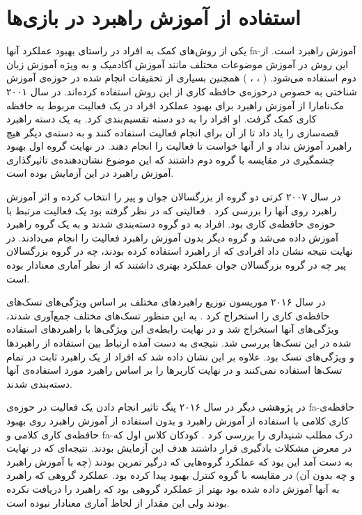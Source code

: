 \documentclass[twoside, a4paper,11pt]{book}
\numberwithin{equation}{chapter}
\numberwithin{table}{chapter}
\numberwithin{figure}{chapter}
\numberwithin{equation}{chapter}
\newcommand{\mls}[1]{\gls{fa-#1}\glsuseri{la-#1}}
\begin{document}
\section{استفاده از آموزش راهبرد در بازی‌ها}
یکی از روش‌های کمک به افراد در راستای بهبود عملکرد آنها \mls{آموزش راهبرد} است. از این روش در آموزش موضوعات مختلف مانند آموزش آکادمیک و به ویژه آموزش زبان دوم استفاده می‌شود. ( \cite{oxford1989LangStrategy}، \cite{nunan2017Lan}، \cite{donker2014Academic}) همچنین بسیاری از تحقیقات انجام شده در حوزه‌ی آموزش شناختی به خصوص درحوزه‌ی حافظه کاری از این روش استفاده کرده‌اند. در سال ۲۰۰۱ مک‌نامارا \cite{mcnamara2001MemCap} از آموزش راهبرد برای بهبود عملکرد افراد در یک فعالیت مربوط به حافظه کاری کمک گرفت. او افراد را به دو دسته تقسیم‌بندی کرد. به یک دسته راهبرد قصه‌سازی را یاد داد تا از آن برای انجام فعالیت استفاده کنند و به دسته‌ی دیگر هیچ راهبرد آموزش نداد و از آنها خواست تا فعالیت را انجام دهند. در نهایت گروه اول بهبود چشمگیری در مقایسه با گروه دوم داشتند که این موضوع نشان‌دهنده‌ی تاثیرگذاری آموزش راهبرد در این آزمایش بوده است.

در سال ۲۰۰۷ کرتی دو گروه از بزرگسالان جوان و پیر را انتخاب کرده و اثر آموزش راهبرد روی آنها را بررسی کرد \cite{carretti2007StaMem}. فعالیتی که در نظر گرفته بود یک فعالیت مرتبط با حوزه‌ی حافظه‌ی کاری بود. افراد به دو گروه دسته‌بندی شدند و به یک گروه راهبرد آموزش داده می‌شد و گروه دیگر بدون آموزش راهبرد فعالیت را انجام می‌دادند. در نهایت نتیجه نشان داد افرادی که از راهبرد استفاده کرده بودند، چه در گروه بزرگسالان پیر چه در گروه بزرگسالان جوان عملکرد بهتری داشتند که از نظر آماری معنادار بوده است.

در سال ۲۰۱۶ موریسون توزیع راهبرد‌های مختلف بر اساس ویژگی‌های تسک‌های حافظه‌ی کاری را استخراج کرد \cite{morrison2016variation}. به این منظور تسک‌های مختلف جمع‌آوری شدند، ویژگی‌های آنها استخراج شد و در نهایت رابطه‌ی این ویژگی‌ها با راهبرد‌های استفاده شده در این تسک‌ها بررسی شد. نتیجه‌ی به دست آمده ارتباط بین استفاده از راهبرد‌ها و ویژگی‌های تسک بود. علاوه بر این نشان داده شد که افراد از یک راهبرد ثابت در تمام تسک‌ها استفاده نمی‌کنند و در نهایت کاربرها را بر اساس راهبرد مورد استفاده‌ی آنها دسته‌بندی شدند.

در پژوهشی دیگر در سال ۲۰۱۶ پنگ تاثیر انجام دادن یک فعالیت در حوزه‌ی \mls{حافظه‌ی کاری کلامی} با استفاده از آموزش راهبرد و بدون استفاده از آموزش راهبرد روی بهبود حافظه‌ی کاری کلامی و \mls{درک مطلب شنیداری} را بررسی کرد \cite{peng2016WMTrain}. کودکان کلاس اول که در معرض مشکلات یادگیری قرار داشتند هدف این آزمایش بودند. نتیجه‌ای که در نهایت به دست آمد این بود که عملکرد گروه‌هایی که درگیر تمرین بودند (چه با آموزش راهبرد و چه بدون آن) در مقایسه با گروه کنترل بهبود پیدا کرده بود. عملکرد گروهی که راهبرد به آنها آموزش داده شده بود بهتر از عملکرد گروهی بود که راهبرد را دریافت نکرده بودند ولی این مقدار از لحاظ آماری معنادار نبوده است. 
\end{document}
